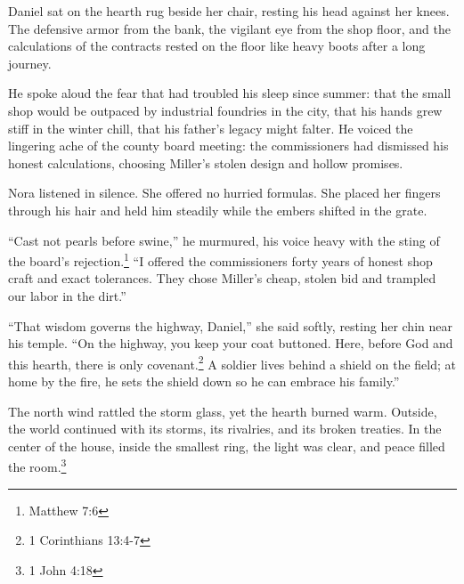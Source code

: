 \documentclass[11pt]{article}
\begin{document}
Daniel sat on the hearth rug beside her chair, resting his head against her knees. The defensive armor from the bank, the vigilant eye from the shop floor, and the calculations of the contracts rested on the floor like heavy boots after a long journey.

He spoke aloud the fear that had troubled his sleep since summer: that the small shop would be outpaced by industrial foundries in the city, that his hands grew stiff in the winter chill, that his father’s legacy might falter. He voiced the lingering ache of the county board meeting: the commissioners had dismissed his honest calculations, choosing Miller's stolen design and hollow promises.

Nora listened in silence. She offered no hurried formulas. She placed her fingers through his hair and held him steadily while the embers shifted in the grate.

``Cast not pearls before swine,'' he murmured, his voice heavy with the sting of the board's rejection.\footnote{Matthew 7:6} ``I offered the commissioners forty years of honest shop craft and exact tolerances. They chose Miller's cheap, stolen bid and trampled our labor in the dirt.''

``That wisdom governs the highway, Daniel,'' she said softly, resting her chin near his temple. ``On the highway, you keep your coat buttoned. Here, before God and this hearth, there is only covenant.\footnote{1 Corinthians 13:4-7} A soldier lives behind a shield on the field; at home by the fire, he sets the shield down so he can embrace his family.''

The north wind rattled the storm glass, yet the hearth burned warm. Outside, the world continued with its storms, its rivalries, and its broken treaties. In the center of the house, inside the smallest ring, the light was clear, and peace filled the room.\footnote{1 John 4:18}
\end{document}
